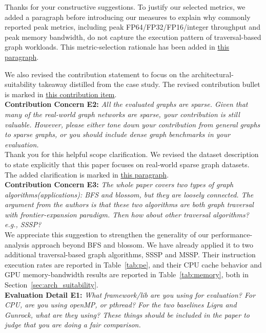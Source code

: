 \noindent Thanks for your constructive suggestions.
To justify our selected metrics, we added a paragraph before introducing our measures to explain why commonly reported peak metrics, including peak FP64/FP32/FP16/integer throughput and peak memory bandwidth, do not capture the execution pattern of traversal-based graph workloads.
This metric-selection rationale has been added in \hyperref[para:metric-selection-justification]{this paragraph}.

\noindent We also revised the contribution statement to focus on the architectural-suitability takeaway distilled from the case study. The revised contribution bullet is marked in \hyperref[item:takeaway-architecture-suitability]{this contribution item}.
\\

\noindent\textbf{Contribution Concern E2:} \textit{All the evaluated graphs are sparse. Given that many of the real-world graph networks are sparse, your contribution is still valuable. However, please either tone down your contribution from general graphs to sparse graphs, or you should include dense graph benchmarks in your evaluation.}
\\

\noindent Thank you for this helpful scope clarification.
We revised the dataset description to state explicitly that this paper focuses on real-world sparse graph datasets.
The added clarification is marked in \hyperref[para:real-world-sparse-datasets]{this paragraph}.
\\

\noindent\textbf{Contribution Concern E3:} \textit{The whole paper covers two types of graph algorithms(applications): BFS and blossom, but they are loosely connected. The argument from the authors is that these two algorithms are both graph traversal with frontier-expansion paradigm. Then how about other traversal algorithms? e.g., SSSP?}
\\

\noindent We appreciate this suggestion to strengthen the generality of our performance-analysis approach beyond BFS and blossom. We have already applied it to two additional traversal-based graph algorithms, SSSP and MSSP. Their instruction execution rates are reported in Table~\ref{tab:pe}, and their CPU cache behavior and GPU memory-bandwidth results are reported in Table~\ref{tab:memory}, both in Section~\ref{sec:arch_suitability}.
\\

\noindent\textbf{Evaluation Detail E1:} \textit{What framework/lib are you using for evaluation? For CPU, are you using openMP, or pthread? For the two baselines Ligra and Gunrock, what are they using? These things should be included in the paper to judge that you are doing a fair comparison.}
\\

